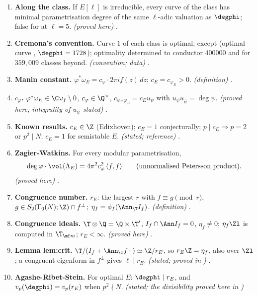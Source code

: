 \begin{enumerate}[label=\textbf{\thechapter.\arabic*}]
{here)} .
\item \textbf{Along the class.} If $E[\ell]$ is irreducible, every curve of the class has minimal parametrisation degree of the same $\ell$-adic valuation as $\degphi$; false for  at $\ell=5$.
\emph{(proved here)} .
\item \textbf{Cremona's convention.} Curve $1$ of each class is optimal, except  (optimal curve , $\degphi=1728$); optimality determined to conductor $400000$ and for $359{,}009$ classes
beyond. \emph{(convention; data)} .
\item \textbf{Manin constant.} $\varphi^*\omega_E=c_\varphi\cdot2\pi if(z)\,dz$; $c_E=c_{\varphi_E}>0$. \emph{(definition)} .
\item \textbf{$c_\varphi$.} $\varphi^*\omega_E\in\C\omega_f\setminus0$, $c_\varphi\in\Q^\times$, $c_{\psi\circ\varphi_E}=c_Eu_\psi$ with $u_\psi u_{\hat\psi}=\deg\psi$. \emph{(proved here; integrality of $u_\psi$ stated)}
.
\item \textbf{Known results.} $c_E\in\Z$ (Edixhoven); $c_E=1$ conjecturally; $p\mid c_E\Rightarrow p=2$ or $p^2\mid N$; $c_E=1$ for semistable $E$. \emph{(stated; reference)} .
\item \textbf{Zagier-Watkins.} For every modular parametrisation,
\[
\deg\varphi\cdot\vol(\Lambda_E)=4\pi^2c_\varphi^2\,\langle f,f\rangle\qquad(\text{unnormalised Petersson product}).
\]
\emph{(proved here)} .
\item \textbf{Congruence number.} $r_E$: the largest $r$ with $f\equiv g\pmod r$, $g\in S_2(\Gamma_0(N);\Z)\cap f^\perp$; $\eta_f=\phi_f(\Ann_\T I_f)$. \emph{(definition)} .
\item \textbf{Congruence ideals.} $\T\otimes\Q=\Q\times\T'$, $I_f\cap\Ann I_f=0$, $\eta_f\ne0$; $\eta_f\Zl$ is computed in $\T_{\mf m}$; $r_E<\infty$. \emph{(proved here)} .
\item \textbf{Lemma lem:crit.} $\T/(I_f+\Ann_\T f^\perp)\simeq\Z/r_E$, so $r_E\Z=\eta_f$, also over $\Zl$; a congruent eigenform in $f^\perp$ gives $\ell\mid r_E$. \emph{(stated; proved in )}
.
\item \textbf{Agashe-Ribet-Stein.} For optimal $E$: $\degphi\mid r_E$, and $v_p(\degphi)=v_p(r_E)$ when $p^2\nmid N$. \emph{(stated; the divisibility proved here in )}

\end{enumerate}
